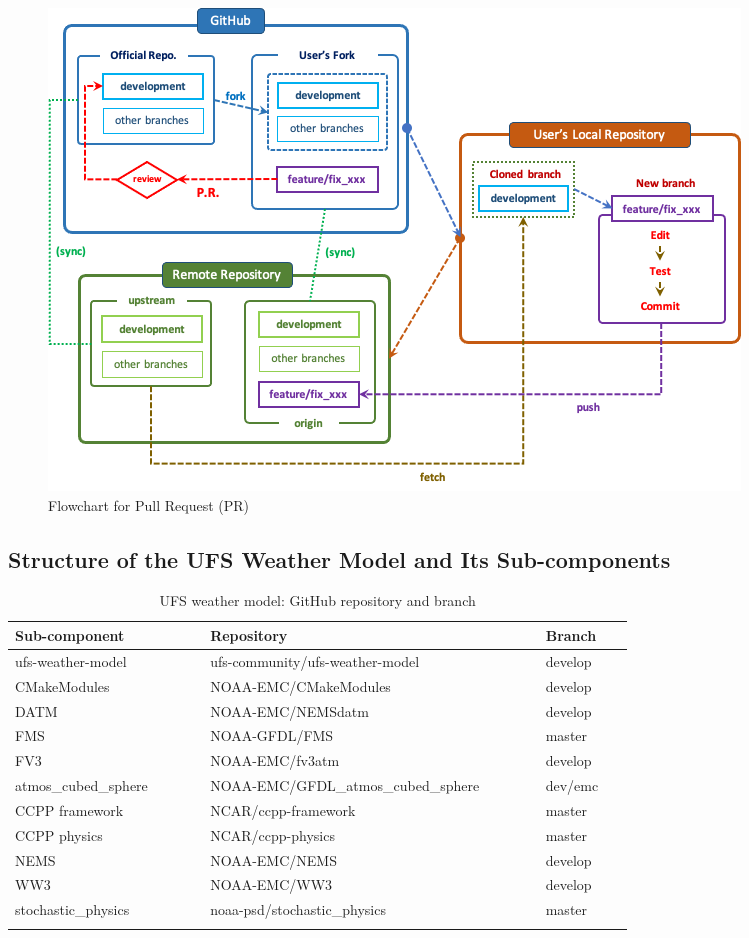 \documentclass[11pt,fleqn]{report}              %
\begin{document}
\begin{figure}[ht!]
  \centering
  \includegraphics[width=0.8\linewidth]{github_flow.png}
  \caption{Flowchart for Pull Request (PR)}
  \label{fig:github_flow}
\end{figure}


\subsection{Structure of the UFS Weather Model and Its Sub-components}

{
\fontsize{10}{12}\selectfont
\begin{longtable}{ p{0.22\linewidth} | p{0.4\linewidth} | p{0.1\linewidth} }
\hline
\hline
Sub-component & Repository & Branch \\
\hline
 ufs-weather-model & ufs-community/ufs-weather-model & develop \\
 CMakeModules & NOAA-EMC/CMakeModules & develop \\
 DATM & NOAA-EMC/NEMSdatm & develop \\
 FMS & NOAA-GFDL/FMS & master \\
 FV3 & NOAA-EMC/fv3atm & develop \\
 atmos\_cubed\_sphere & NOAA-EMC/GFDL\_atmos\_cubed\_sphere & dev/emc \\
 CCPP framework & NCAR/ccpp-framework & master \\
 CCPP physics & NCAR/ccpp-physics & master \\
 NEMS & NOAA-EMC/NEMS & develop \\
 WW3 & NOAA-EMC/WW3 & develop \\
 stochastic\_physics & noaa-psd/stochastic\_physics & master \\
\hline
\caption{UFS weather model: GitHub repository and branch}
\label{table:ufs_weather_github_repo}
\end{longtable}
}
\end{document}
